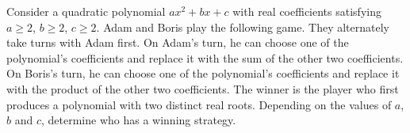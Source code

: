 Consider a quadratic polynomial $ax^2+bx+c$ with real coefficients satisfying $a\ge 2$, $b\ge 2$, $c\ge 2$. Adam and Boris play the following game. They alternately take turns with Adam first. On Adam’s turn, he can choose one of the polynomial’s coefficients and replace it with the sum of the other two coefficients. On Boris’s turn, he can choose one of the polynomial’s coefficients and replace it with the product of the other two coefficients. The winner is the player who first produces a polynomial with two distinct real roots. Depending on the values of $a$, $b$ and $c$, determine who has a winning strategy.